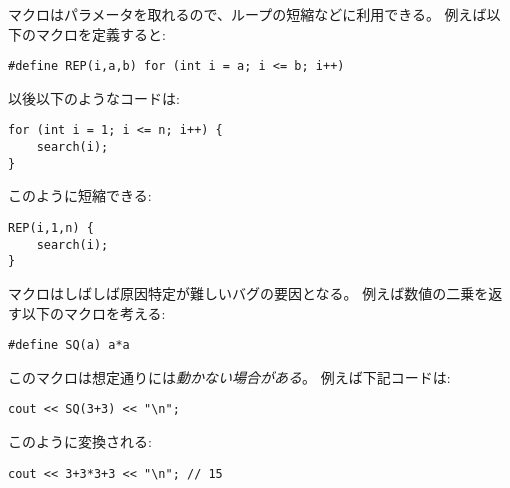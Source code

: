 \begin{comment}
A macro can also have parameters
which makes it possible to shorten loops and other
structures.
For example, we can define the following macro:
\begin{lstlisting}
#define REP(i,a,b) for (int i = a; i <= b; i++)
\end{lstlisting}
After this, the code
\begin{lstlisting}
for (int i = 1; i <= n; i++) {
    search(i);
}
\end{lstlisting}
can be shortened as follows:
\begin{lstlisting}
REP(i,1,n) {
    search(i);
}
\end{lstlisting}
\end{comment}

マクロはパラメータを取れるので、ループの短縮などに利用できる。
例えば以下のマクロを定義すると:
\begin{lstlisting}
#define REP(i,a,b) for (int i = a; i <= b; i++)
\end{lstlisting}
以後以下のようなコードは:
\begin{lstlisting}
for (int i = 1; i <= n; i++) {
    search(i);
}
\end{lstlisting}
このように短縮できる:
\begin{lstlisting}
REP(i,1,n) {
    search(i);
}
\end{lstlisting}

\begin{comment}
Sometimes macros cause bugs that may be difficult
to detect. For example, consider the following macro
that calculates the square of a number:
\begin{lstlisting}
#define SQ(a) a*a
\end{lstlisting}
This macro \emph{does not} always work as expected.
For example, the code
\begin{lstlisting}
cout << SQ(3+3) << "\n";
\end{lstlisting}
corresponds to the code
\begin{lstlisting}
cout << 3+3*3+3 << "\n"; // 15
\end{lstlisting}
\end{comment}

マクロはしばしば原因特定が難しいバグの要因となる。
例えば数値の二乗を返す以下のマクロを考える:
\begin{lstlisting}
#define SQ(a) a*a
\end{lstlisting}
このマクロは想定通りには\emph{動かない場合がある}。
例えば下記コードは:
\begin{lstlisting}
cout << SQ(3+3) << "\n";
\end{lstlisting}
このように変換される:
\begin{lstlisting}
cout << 3+3*3+3 << "\n"; // 15
\end{lstlisting}

